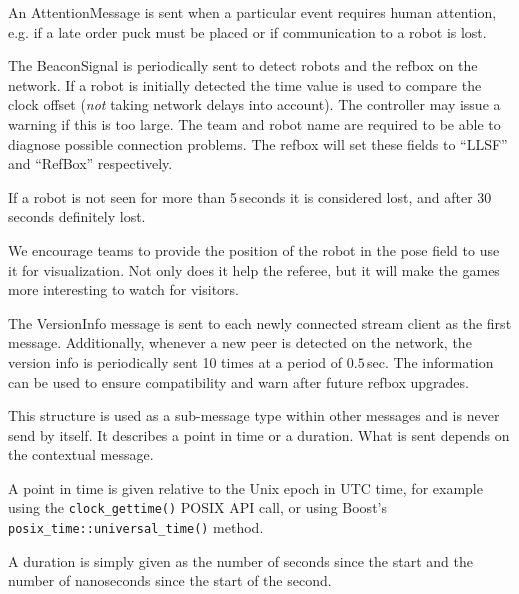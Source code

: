 \documentclass[a4paper]{article}
\begin{document}
%
{%
  An AttentionMessage is sent when a particular event requires human
  attention, e.g. if a late order puck must be placed or if
  communication to a robot is lost.
}

%
{%
  The BeaconSignal is periodically sent to detect robots and the
  refbox on the network. If a robot is initially detected the time
  value is used to compare the clock offset (\emph{not} taking network
  delays into account). The controller may issue a warning if this is
  too large. The team and robot name are required to be able to
  diagnose possible connection problems. The refbox will set these
  fields to ``LLSF'' and ``RefBox'' respectively.

  \smallskip

  If a robot is not seen for more than 5\,seconds it is considered
  lost, and after 30\,seconds definitely lost.

  \smallskip

  We encourage teams to provide the position of the robot in the pose
  field to use it for visualization. Not only does it help the
  referee, but it will make the games more interesting to watch for
  visitors.  }

%
{%
  The VersionInfo message is sent to each newly connected stream
  client as the first message. Additionally, whenever a new peer is
  detected on the network, the version info is periodically sent 10
  times at a period of $0.5$\,sec. The information can be used to
  ensure compatibility and warn after future refbox upgrades.
}

%
{%
  This structure is used as a sub-message type within other messages
  and is never send by itself. It describes a point in time or a
  duration. What is sent depends on the contextual message.

  \smallskip

  A point in time is given relative to the Unix epoch in UTC time, for
  example using the \texttt{clock\_gettime()} POSIX API call, or using
  Boost's \texttt{posix\_time::universal\_time()} method.

  A duration is simply given as the number of seconds since the start
  and the number of nanoseconds since the start of the second.
}
\end{document}
